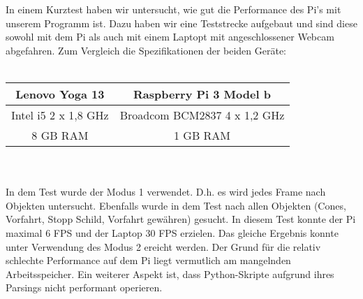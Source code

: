 In einem Kurztest haben wir untersucht, wie gut die Performance des Pi's mit unserem Programm ist. Dazu haben wir eine Teststrecke aufgebaut und sind diese sowohl mit dem Pi als auch mit einem Laptopt mit angeschlossener Webcam abgefahren. 
Zum Vergleich die Spezifikationen der beiden Geräte:
\\
\\
\begin{minipage}{\linewidth}

\centering

\begin{tabular}{|c|c|}
\hline
Lenovo Yoga 13 & Raspberry Pi 3 Model b\\
\hline
\hline
Intel i5 2 x 1,8 GHz & Broadcom BCM2837 4 x 1,2 GHz\\
\hline
8 GB RAM & 1 GB RAM\\
\hline
\end{tabular}
\end{minipage}
\\
\\
In dem Test wurde der Modus 1 verwendet. D.h. es wird jedes Frame nach Objekten untersucht. Ebenfalls wurde in dem Test nach allen Objekten (Cones, Vorfahrt, Stopp Schild, Vorfahrt gewähren) gesucht. In diesem Test konnte der Pi maximal 6 FPS und der Laptop 30 FPS erzielen. 
Das gleiche Ergebnis konnte unter Verwendung des Modus 2 ereicht werden. 
Der Grund für die relativ schlechte Performance auf dem Pi liegt vermutlich am mangelnden Arbeitsspeicher. Ein weiterer Aspekt ist, dass Python-Skripte aufgrund ihres Parsings nicht performant operieren.
